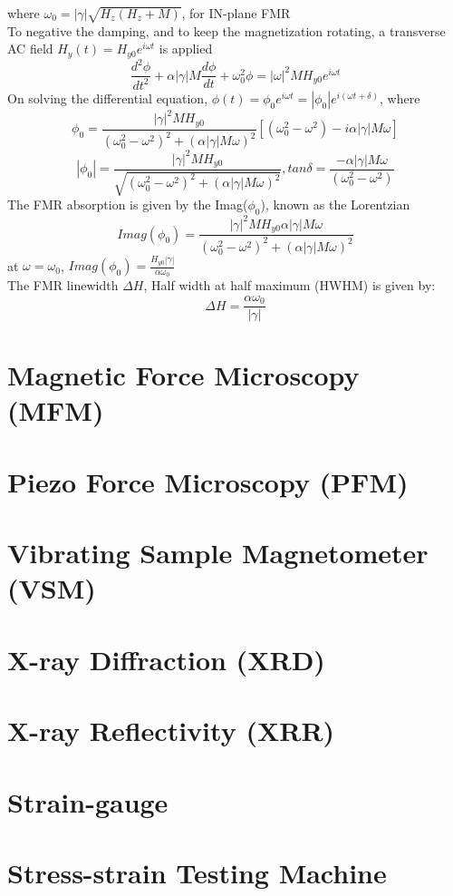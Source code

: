 where $\omega_0=|\gamma|\sqrt{H_z(H_z+M)}$, for IN-plane FMR\\
To negative the damping, and to keep the magnetization rotating, a transverse AC field $H_y(t)=H_{y0}e^{i\omega t}$ is applied
\[\frac{d^2\phi}{dt^2}+\alpha|\gamma|M\frac{d\phi}{dt}+\omega_0^2\phi =|\omega|^2MH_{y0}e^{i\omega t} \]
On solving the differential equation, $\phi(t)=\phi_0e^{i\omega t}=|\phi_0|e^{i(\omega t+\delta)}$, where\\
\[\phi_0=\frac{|\gamma|^2MH_{y0}}{(\omega_0^2 - \omega^2)^2 + (\alpha|\gamma|M\omega)^2}[(\omega_0^2 - \omega^2)-i\alpha|\gamma|M\omega]\]
\[|\phi_0|=\frac{|\gamma|^2MH_{y0}}{\sqrt{(\omega_0^2 - \omega^2)^2 + (\alpha|\gamma|M\omega)^2}}, tan \delta = \frac{-\alpha|\gamma|M\omega}{(\omega_0^2 - \omega^2)}\]
The FMR absorption is given by the Imag($\phi_0$), known as the Lorentzian
\[Imag(\phi_0)=\frac{|\gamma|^2MH_{y0}\alpha|\gamma|M\omega}{(\omega_0^2 - \omega^2)^2 + (\alpha|\gamma|M\omega)^2}\]
at $\omega=\omega_0$, $Imag(\phi_0)=\frac {H_{y0}|\gamma|}{\alpha \omega_0}$\\
The FMR linewidth $\Delta H$, Half width at half maximum (HWHM) is given by:
\[\Delta H =\frac{\alpha\omega_0}{|\gamma|}\]
\section{Magnetic Force Microscopy (MFM)}
\section{Piezo Force Microscopy (PFM)}
\section{Vibrating Sample Magnetometer (VSM)}
\section{X-ray Diffraction (XRD)}
\section{X-ray Reflectivity (XRR)}
\section{Strain-gauge}
\section{Stress-strain Testing Machine}
